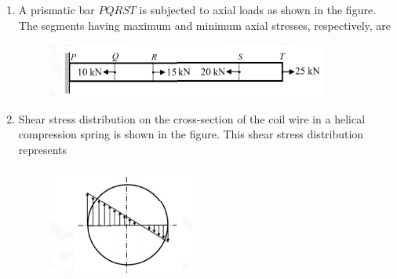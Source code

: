 \documentclass[journal]{IEEEtran}
\begin{document}
\begin{enumerate}
\begin{enumerate}
\end{enumerate}

\hfill{}

\item A prismatic bar $PQRST$ is subjected to axial loads as shown in the figure. The segments having maximum and minimum axial stresses, respectively, are
\begin{figure}[h]
\centering
\includegraphics[width=0.5\columnwidth]{Figs/image (45).png}
\caption*{}
\label{fig:18}
\end{figure}
\newpage

\begin{enumerate}
\end{enumerate}

\hfill{}


\item Shear stress distribution on the cross-section of the coil wire in a helical compression spring is shown in the figure. This shear stress distribution represents
\begin{figure}[h]
\centering
\includegraphics[width=0.5\columnwidth]{Figs/image (46).png}
\caption*{}
\label{fig:19}
\end{figure}


\end{enumerate}
\end{document}
